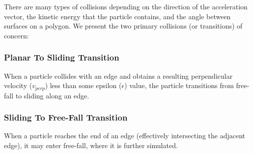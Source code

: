 There are many types of collisions depending on the direction of the acceleration vector, the kinetic energy that the particle contains, and the angle between surfaces on a polygon. We present the two primary collisions (or transitions) of concern:

		\subsubsection{Planar To Sliding Transition}

When a particle collides with an edge and obtains a resulting perpendicular velocity ($v_{perp}$) less than some epsilon ($\epsilon$) value, the particle transitions from free-fall to sliding along an edge.




		\subsubsection{Sliding To Free-Fall Transition}

When a particle reaches the end of an edge (effectively intersecting the adjacent edge), it may enter free-fall, where it is further simulated.








